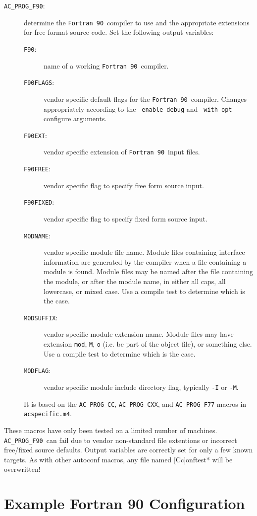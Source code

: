 \documentclass[11pt]{nmemo}
\newcommand{\fninety}{\texttt{Fortran~90}}
\newcommand{\progfninety}{\texttt{AC\_PROG\_F90}}
\begin{document}
\begin{description}
\item[\progfninety:] determine the \fninety\ compiler to use and the
appropriate extensions for free format source code.  Set the
following output variables:
\begin{description}
\item[\texttt{F90}:] name of a working \fninety\ compiler.
\item[\texttt{F90FLAGS}:] vendor specific default flags for the
\fninety\ compiler.  Changes appropriately according to the
\texttt{--enable-debug} and \texttt{--with-opt} configure arguments.
\item[\texttt{F90EXT}:] vendor specific extension of \fninety\ input files.
\item[\texttt{F90FREE}:] vendor specific flag to specify free form
source input. 
\item[\texttt{F90FIXED}:] vendor specific flag to specify fixed form
source input. 
\item[\texttt{MODNAME}:] vendor specific module file name.  Module
files containing interface information are generated by the compiler
when a file containing a module is found.  Module files may be named
after the file containing the module, or after the module name, in
either all caps, all lowercase, or mixed case.  Use a compile test to
determine which is the case.   
\item[\texttt{MODSUFFIX}:] vendor specific module extension name.
Module files may have extension \texttt{mod}, \texttt{M}, \texttt{o}
(i.e. be part of the object file), or something else.  Use a compile
test to determine which is the case.
\item[\texttt{MODFLAG}:] vendor specific module include directory
flag, typically \texttt{-I} or \texttt{-M}.
\end{description}
It is based on the \texttt{AC\_PROG\_CC}, \texttt{AC\_PROG\_CXX}, and
\texttt{AC\_PROG\_F77} macros in \texttt{acspecific.m4}.
\end{description}

These macros have only been tested on a limited number of machines.
\progfninety\ can fail due to vendor non-standard file extentions or
incorrect free/fixed source defaults.  Output variables are correctly
set for only a few known targets.  As with other autoconf macros, any
file named [Cc]onftest* will be overwritten!

\section{Example Fortran 90 Configuration}
\end{document}
